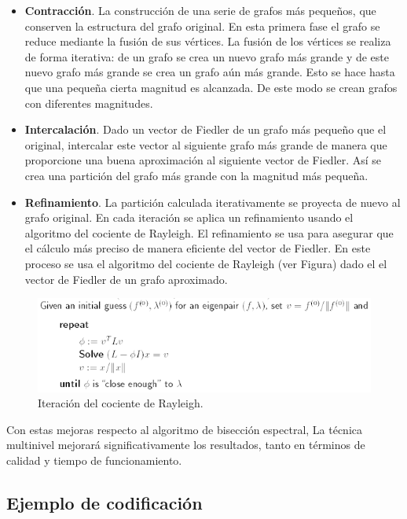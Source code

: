 \begin{itemize}
	\item \textbf{Contracción}. La construcción de una serie de grafos más pequeños, que conserven la estructura del grafo original. En esta primera fase el grafo se reduce mediante la fusión de sus vértices. La fusión de los vértices se realiza de forma iterativa: de un grafo se crea un nuevo grafo más grande y de este nuevo grafo más grande se crea un grafo aún más grande. Esto se hace hasta que una pequeña cierta magnitud es alcanzada. De este modo se crean grafos con diferentes magnitudes. 
	\item \textbf{Intercalación}. Dado un vector de Fiedler de un grafo más pequeño que el original, intercalar este vector al siguiente grafo más grande de manera que proporcione una buena aproximación al siguiente vector de Fiedler. Así se crea una partición del grafo más grande con la magnitud más pequeña. 
	\item \textbf{Refinamiento}. La partición calculada iterativamente se proyecta de nuevo al grafo original. En cada iteración se aplica un refinamiento usando el algoritmo del cociente de Rayleigh. El refinamiento se usa para asegurar que el cálculo más preciso de manera eficiente del vector de Fiedler. En este proceso se usa el algoritmo del cociente de Rayleigh (ver Figura) dado el el vector de Fiedler de un grafo aproximado. 
\end{itemize}

\begin{figure}[h]
	\centering
	\includegraphics[scale=0.8]{Figures/rayleigh}
	\vspace{1mm}
	\caption{Iteración del cociente de Rayleigh.}
	\label{rayleigh}
\end{figure}

Con estas mejoras respecto al algoritmo de bisección espectral, La técnica multinivel mejorará significativamente los resultados, tanto en términos de calidad y tiempo de funcionamiento.

\newpage
\subsection{Ejemplo de codificación}

